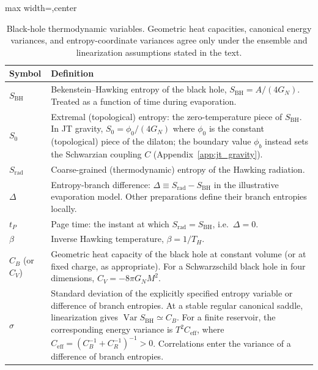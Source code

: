 \documentclass[11pt,letterpaper]{article}
\theoremstyle{plain}
\theoremstyle{definition}
\theoremstyle{remark}
\begin{document}
\begin{table}[ht]
\centering
\renewcommand{\arraystretch}{1.35}
\begin{adjustbox}{max width=\textwidth,center}
\begin{tabular}{@{}lp{10.6cm}@{}}
\hline
\textbf{Symbol} & \textbf{Definition} \\
\hline
$S_{\mathrm{BH}}$ &
  Bekenstein--Hawking entropy of the black hole, $S_{\mathrm{BH}} = A/(4G_N)$.
  Treated as a function of time during evaporation. \\
$S_0$ &
  Extremal (topological) entropy: the zero-temperature piece of
  $S_{\mathrm{BH}}$.  In JT gravity, $S_0 = \phi_0/(4G_N)$
  where $\phi_0$ is the constant (topological) piece of the dilaton;
  the boundary value $\phi_b$ instead sets the Schwarzian coupling $C$
  (Appendix~\ref{app:jt_gravity}). \\
$S_{\mathrm{rad}}$ &
  Coarse-grained (thermodynamic) entropy of the Hawking radiation. \\
$\Delta$ &
  Entropy-branch difference: $\Delta \equiv S_{\mathrm{rad}} - S_{\mathrm{BH}}$
  in the illustrative evaporation model. Other preparations define their
  branch entropies locally. \\
$t_P$ &
  Page time: the instant at which $S_{\mathrm{rad}} = S_{\mathrm{BH}}$, i.e.\
  $\Delta = 0$. \\
$\beta$ &
  Inverse Hawking temperature, $\beta = 1/T_H$. \\
$C_B$ (or $C_V$) &
  Geometric heat capacity of the black hole at constant volume (or at fixed charge, as
  appropriate).  For a Schwarzschild black hole in four dimensions,
  $C_V = -8\pi G_N M^{2}$. \\
$\sigma$ &
  Standard deviation of the explicitly specified entropy variable or
  difference of branch entropies.  At a stable regular canonical saddle,
  linearization gives $\operatorname{Var}S_{\mathrm{BH}}\simeq C_B$.
  For a finite reservoir, the corresponding energy variance is
  $T^2C_{\mathrm{eff}}$, where
  $C_{\mathrm{eff}}=(C_B^{-1}+C_R^{-1})^{-1}>0$.
  Correlations enter the variance of a difference of branch entropies. \\
\hline
\end{tabular}
\end{adjustbox}
\caption{Black-hole thermodynamic variables.  Geometric heat capacities,
canonical energy variances, and entropy-coordinate variances agree only under
the ensemble and linearization assumptions stated in the text.}
\label{tab16:bh_variables}
\end{table}
\end{document}
